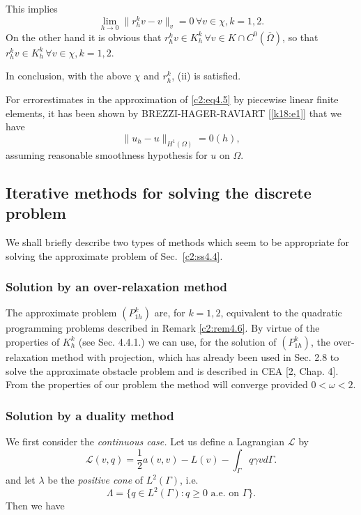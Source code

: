  This implies 
 \begin{equation}
\lim_{h \to 0} \parallel r^k_h v-v\parallel_v = 0\, \forall  v \in \chi, k=1,
2. \tag{4.41}\label{c2:eq4.41} 
 \end{equation} 
 On the other hand it is obvious that $r^k_h v \in K^k_h\, \forall 
 v \in K \cap C^0 (\overline{\Omega})$, so that $r^k_h v \in
 K^k_h\, \forall  v \in \chi, k=1, 2$. 
 
In conclusion, with the above $\chi$ and $r^k_h$, (ii) is satisfied. 

 \begin{remark}\label{c2:rem4.8}%
For error\pageoriginale  estimates in the approximation of
\eqref{c2:eq4.5} by piecewise   linear finite elements, it has been
shown by BREZZI-HAGER-RAVIART [\ref{k18:e1}] that we have  
$$
\parallel u_h-u\parallel_{H^1(\Omega)} = 0 (h),
$$
assuming reasonable smoothness hypothesis for $u$ on $\Omega$.
\end{remark} 
\subsection{Iterative methods for solving the discrete problem}\label{c2:ss4.6} 
We shall briefly describe two  types of methods which seem  to be
appropriate for solving the approximate problem  of Sec.~\ref{c2:ss4.4}. 

\subsubsection{Solution by an over-relaxation method}\label{c2:sss4.6.1} 
The approximate problem $(P^k_{1h})$ are, for $k=1, 2$, equivalent to
the quadratic programming problems described in Remark \ref{c2:rem4.6}. By virtue
of the properties of $K^k_h$ (see Sec. 4.4.1.) we can use,  for the
solution of $(P^k_{1h} )$, the over-relaxation method with projection,
which has already been used in Sec. 2.8 to  solve the approximate
obstacle problem and is described in CEA [2, Chap. 4]. From the
properties of our problem the method will converge provided $0 <
\omega < 2$.  

\subsubsection{Solution by a duality method}\label{c2:sss4.6.2} 
We first consider the \textit{continuous case.} Let us define a
Lagrangian $\mathscr{L}$ by 
\begin{equation}
\mathscr{L} (v, q) = \frac{1}{2} a(v, v) -L (v) - \int_\Gamma q \gamma
v d \Gamma. \tag{4.42}\label{c2:eq4.42} 
\end{equation} 	
and let $\lambda$ be the \textit{positive cone} of $L^2(\Gamma)$, i.e. 
$$
\Lambda = \{q \in L^2 (\Gamma) : q \geq 0 \text{ a.e. on } 
\Gamma\}. 
$$
Then we have 

